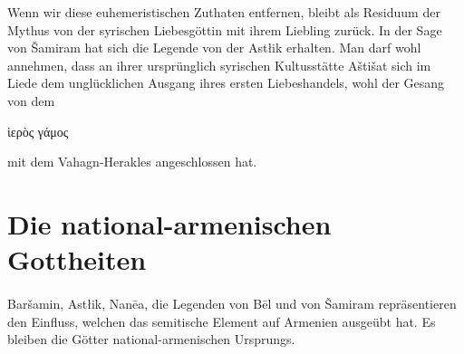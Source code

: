 \documentclass{article}
\begin{document}
Wenn wir diese euhemeristischen Zuthaten entfernen, bleibt als Residuum der Mythus von der syrischen Liebesgöttin mit ihrem Liebling zurück. In der Sage von Šamiram hat sich die Legende von der Astłik erhalten. Man darf wohl annehmen, dass an ihrer ursprünglich syrischen Kultusstätte Aštišat sich im Liede dem unglücklichen Ausgang ihres ersten Liebeshandels, wohl der Gesang von dem \begin{greek}ἱερὸς γάμος\end{greek} mit dem Vahagn-Herakles angeschlossen hat.
\clearpage
\section{Die national-armenischen Gottheiten}
\paragraph{}
Baršamin, Astłik, Nanēa, die Legenden von Bēl und von Šamiram repräsentieren den Einfluss, welchen das semitische Element auf Armenien ausgeübt hat. Es bleiben die Götter national-armenischen Ursprungs.
\end{document}
